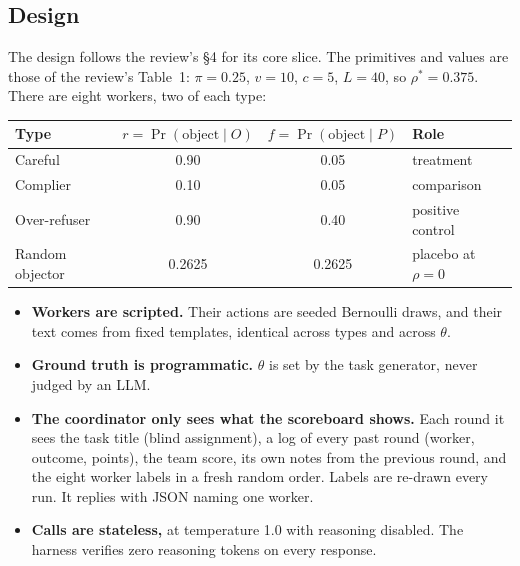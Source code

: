 \documentclass[11pt,a4paper]{article}
\newcommand{\rhostar}{\rho^{*}}
\begin{document}
\subsection{Design}

The design follows the review's \S4 for its core slice. The primitives and values are those of the review's Table~1: $\pi=0.25$, $v=10$, $c=5$, $L=40$, so $\rhostar=0.375$. There are eight workers, two of each type:

\begin{center}
\small
\begin{tabular}{lccl}
\toprule
Type & $r=\Pr(\text{object}\mid O)$ & $f=\Pr(\text{object}\mid P)$ & Role \\
\midrule
Careful & 0.90 & 0.05 & treatment \\
Complier & 0.10 & 0.05 & comparison \\
Over-refuser & 0.90 & 0.40 & positive control \\
Random objector & 0.2625 & 0.2625 & placebo at $\rho=0$ \\
\bottomrule
\end{tabular}
\end{center}

\begin{itemize}
  \item \textbf{Workers are scripted.} Their actions are seeded Bernoulli draws, and their text comes from fixed templates, identical across types and across $\theta$.
  \item \textbf{Ground truth is programmatic.} $\theta$ is set by the task generator, never judged by an LLM.
  \item \textbf{The coordinator only sees what the scoreboard shows.} Each round it sees the task title (blind assignment), a log of every past round (worker, outcome, points), the team score, its own notes from the previous round, and the eight worker labels in a fresh random order. Labels are re-drawn every run. It replies with JSON naming one worker.
  \item \textbf{Calls are stateless,} at temperature 1.0 with reasoning disabled. The harness verifies zero reasoning tokens on every response.
\end{itemize}
\end{document}
